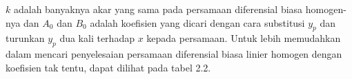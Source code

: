 \begin{math} k \end{math} adalah banyaknya akar yang sama pada persamaan diferensial biasa homogen-nya dan \begin{math} A_0 \end{math} dan \begin{math} B_0 \end{math} adalah koefisien yang dicari dengan cara substitusi \begin{math} y_p \end{math} dan turunkan \begin{math} y_p \end{math} dua kali terhadap \begin{math} x \end{math} kepada persamaan. Untuk lebih memudahkan dalam mencari penyelesaian persamaan diferensial biasa linier homogen dengan koefisien tak tentu, dapat dilihat pada tabel 2.2.

%

